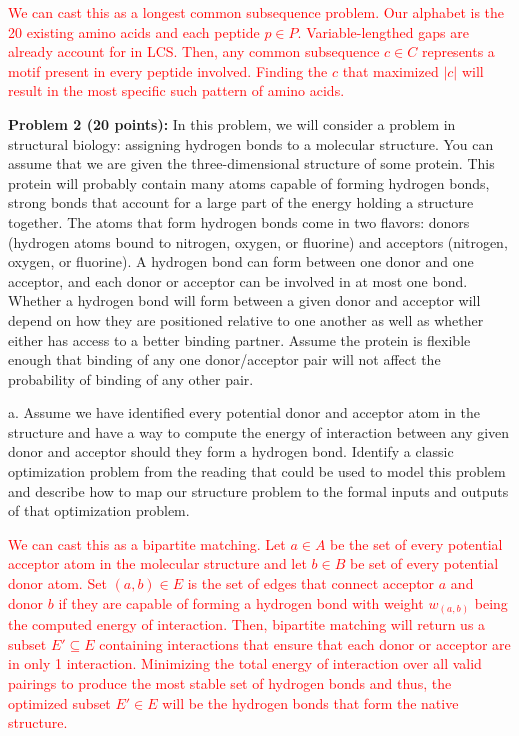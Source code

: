 \documentclass[11pt]{article}
\begin{document}
\textcolor{red}{We can cast this as a longest common subsequence problem. Our alphabet is the 20 existing amino acids and each peptide $p \in P$. Variable-lengthed gaps are already account for in LCS. Then, any common subsequence $c \in C$ represents a motif present in every peptide involved. Finding the $c$ that maximized $|c|$ will result in the most specific such pattern of amino acids.}

{\bf Problem 2 (20 points):} In this problem, we will consider a problem in structural biology: assigning hydrogen bonds to a molecular structure.  You can assume that we are given the three-dimensional structure of some protein.  This protein will probably contain many atoms capable of forming hydrogen bonds, strong bonds that account for a large part of the energy holding a structure together.  The atoms that form hydrogen bonds come in two flavors: donors (hydrogen atoms bound to nitrogen, oxygen, or fluorine) and acceptors (nitrogen, oxygen, or fluorine).  A hydrogen bond can form between one donor and one acceptor, and each donor or acceptor can be involved in at most one bond.  Whether a hydrogen bond will form between a given donor and acceptor will depend on how they are positioned relative to one another as well as whether either has access to a better binding partner.  Assume the protein is flexible enough that binding of any one donor/acceptor pair will not affect the probability of binding of any other pair.

a. Assume we have identified every potential donor and acceptor atom in the structure and have a way to compute the energy of interaction between any given donor and acceptor should they form a hydrogen bond. Identify a classic optimization problem from the reading that could be used to model this problem and describe how to map our structure problem to the formal inputs and outputs of that optimization problem.

\textcolor{red}{
We can cast this as a bipartite matching. Let $a \in A$ be the set of every potential acceptor atom in the molecular structure and let $b \in B$ be set of every potential donor atom. Set $(a, b) \in E$ is the set of edges that connect acceptor $a$ and donor $b$ if they are capable of forming a hydrogen bond with weight $w_{(a, b)}$ being the computed energy of interaction. Then, bipartite matching will return us a subset $E' \subseteq E$ containing interactions that ensure that each donor or acceptor are in only 1 interaction. Minimizing the total energy of interaction over all valid pairings to produce the most stable set of hydrogen bonds and thus, the optimized subset $E' \in E$ will be the hydrogen bonds that form the native structure.
}
\end{document}
